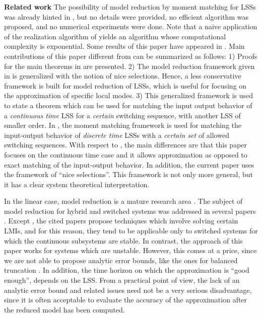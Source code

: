 \documentclass[journal]{IEEEtran}
\begin{document}
\textbf{Related work} The possibility of model reduction by moment matching for LSSs was already hinted in \cite{petreczky}, but no details were provided, no efficient algorithm was proposed, and no numerical experiments were done. Note that a naive application of the realization algorithm of \cite{petreczky} yields an algorithm whose computational complexity is exponential. Some results of this paper have appeared in \cite{bastugACC2014}. Main contributions of this paper different from \cite{bastugACC2014} can be summarized as follows: 1) Proofs for the main theorems in \cite{bastugACC2014} are presented. 2) The model reduction framework given in \cite{bastugACC2014} is generalized with the notion of nice selections. Hence, a less conservative framework is built for model reduction of LSSs, which is useful for focusing on the approximation of specific local modes. 3) This generalized framework is used to state a theorem which can be used for matching the input output behavior of a \emph{continuous time} LSS for a \emph{certain} switching sequence, with another LSS of smaller order. In \cite{bastugCDC2014}, the moment matching framework is used for matching the input-output behavior of \emph{discrete time} LSSs with a \emph{certain set} of allowed switching sequences. With respect to \cite{bastugCDC2014}, the main differences are that this paper focuses on the continuous time case and it allows approximation as opposed to exact matching of the input-output behavior. In addition,
the current paper uses the framework of  ``nice selections''. This framework is not only more general, but it has a clear system theoretical interpretation.

In the linear case, model reduction is a mature research area \cite{antoulas}. The subject of model reduction for hybrid and switched systems was addressed in several papers \cite{French1,Zhang20082944,Mazzi1,Chahlaoui,Habets1,China2,China3,Lam1,Kotsalis2,Kotsalis1,6209392,shaker2011}.
Except \cite{Habets1}, the cited papers propose techniques which involve solving certain LMIs, and for this reason, they tend to be applicable only to switched systems for which the continuous subsystems are stable.
In contrast, the approach of this paper works for systems which are unstable. However, this comes at a price, since we are not able to propose analytic error bounds, like the ones for balanced truncation \cite{petreczky2013}. In addition, the time horizon on which the approximation is ``good enough'', depends on the LSS. From a practical point of view, the lack of an analytic error bound and related issues need not be a very serious disadvantage, since it is often acceptable to evaluate the accuracy of the approximation after the reduced model has been computed.
\end{document}
